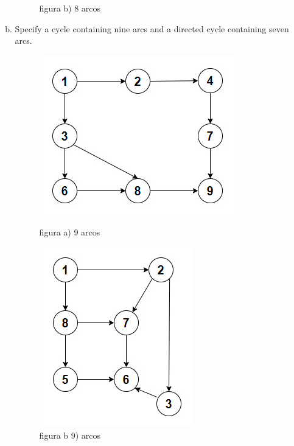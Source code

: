 \documentclass{report}
\begin{document}
\begin{enumerate}[2.1]
\begin{enumerate}[(a)]
\begin{figure}[ht]
\begin{minipage}[b]{0.4\linewidth}
            \caption{figura b) 8 arcos}
            \label{8 arcos 2}
            \end{minipage}
        \end{figure}
        \newpage
        \item Specify a cycle containing nine arcs and a directed cycle containing seven arcs.
        \begin{figure}[h]
            \begin{minipage}[b]{0.4\linewidth}
            \centering
            \includegraphics[scale = 0.5]{problema2.1incisodfigurab9arcos.jpeg}
            \caption{figura a) 9 arcos}
            \label{fig:figura3}
            \end{minipage}
            \hspace{0.5cm}
            \begin{minipage}[b]{0.4\linewidth}
            \centering
            \includegraphics[scale = 0.5]{problema2.1incisodfiguraa9arcos.jpeg}
            \caption{figura b 9) arcos}
            \label{fig:figura4}
            \end{minipage}
        \end{figure}

\end{enumerate}
\end{enumerate}
\end{document}
